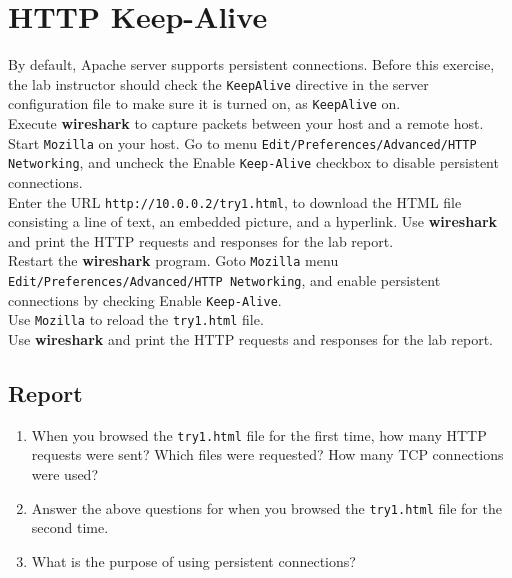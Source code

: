 \documentclass[10pt,a4paper]{article}
\numberwithin{equation}{section}
\numberwithin{figure}{section}
\numberwithin{table}{section}
\begin{document}
    \section*{HTTP Keep-Alive}
    By default, Apache server supports persistent connections. Before this exercise, the lab instructor should check the \texttt{KeepAlive} directive in the server configuration file to make sure it is turned on, as \texttt{KeepAlive} on. \\
    Execute \textbf{wireshark} to capture packets between your host and a remote host. \\
    Start \texttt{Mozilla} on your host. Go to menu \texttt{Edit/Preferences/Advanced/HTTP Networking}, and uncheck the Enable \texttt{Keep-Alive} checkbox to disable persistent connections. \\
    Enter the URL \texttt{http://10.0.0.2/try1.html}, to download the HTML file consisting a line of text, an embedded picture, and a hyperlink.
    Use \textbf{wireshark} and print the HTTP requests and responses for the lab report. \\
    Restart the \textbf{wireshark} program. Goto \texttt{Mozilla} menu \texttt{Edit/Preferences/Advanced/HTTP Networking}, and enable persistent connections by checking Enable \texttt{Keep-Alive}. \\
    Use \texttt{Mozilla} to reload the \texttt{try1.html} file. \\
    Use \textbf{wireshark} and print the HTTP requests and responses for the lab report.

    \subsection*{Report}
    \begin{enumerate}
        \item When you browsed the \texttt{try1.html} file for the first time, how many HTTP requests were sent?
        Which files were requested?
        How many TCP connections were used?
        \item Answer the above questions for when you browsed the \texttt{try1.html} file for the second time.
        \item What is the purpose of using persistent connections?
    \end{enumerate}

\end{document}
